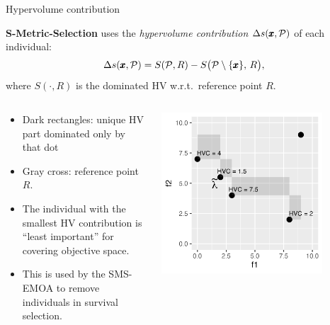 \documentclass[11pt,compress,t,notes=noshow,xcolor=table]{beamer}
\newcommand{\xx}{\conf}     %
\begin{document}


\begin{vbframe}{Hypervolume contribution}

\textbf{S-Metric-Selection} uses the \emph{hypervolume contribution} $\Delta s(\xx,\mathcal{P})$ of each individual:
\[
  \Delta s(\xx, \mathcal{P})
  = S(\mathcal{P}, R) - S\bigl(\mathcal{P}\setminus\{\xx\},\,R\bigr),
\]
where $S(\cdot,R)$ is the dominated HV w.r.t.\ reference point $R$.

{\small
\begin{columns}
\begin{column}{0.5\textwidth}
\begin{itemize}
\item Dark rectangles: unique HV part dominated only by that dot
\item Gray cross: reference point $R$.
\item The individual with the smallest HV contribution is “least important” for covering objective space.
\item This is used by the SMS-EMOA to remove individuals in survival selection.
\end{itemize}
\end{column}
\begin{column}{0.5\textwidth}
\begin{center}
\includegraphics[width=0.8\textwidth]{figure_man/hv_contrib.png}
\end{center}
\end{column}
\end{columns}
}
\end{vbframe}
\end{document}
